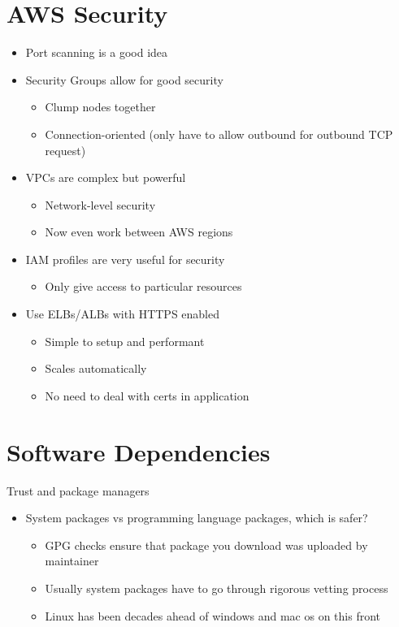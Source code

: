 \documentclass{article}[18pt]
\begin{document}
\section{AWS Security}
\begin{itemize}
	\item Port scanning is a good idea
	\item Security Groups allow for good security
	\begin{itemize}
		\item Clump nodes together
		\item Connection-oriented (only have to allow outbound for outbound TCP request)
	\end{itemize}
	\item VPCs are complex but powerful
	\begin{itemize}
		\item Network-level security
		\item Now even work between AWS regions
	\end{itemize}
	\item IAM profiles are very useful for security
	\begin{itemize}
		\item Only give access to particular resources
	\end{itemize}
	\item Use ELBs/ALBs with HTTPS enabled
	\begin{itemize}
		\item Simple to setup and performant
		\item Scales automatically
		\item No need to deal with certs in application
	\end{itemize}
\end{itemize}
\section{Software Dependencies}
Trust and package managers
\begin{itemize}
	\item System packages vs programming language packages, which is safer?
	\begin{itemize}
		\item GPG checks ensure that package you download was uploaded by maintainer
		\item Usually system packages have to go through rigorous vetting process
		\item Linux has been decades ahead of windows and mac os on this front
	\end{itemize}
\end{itemize}
\end{document}
